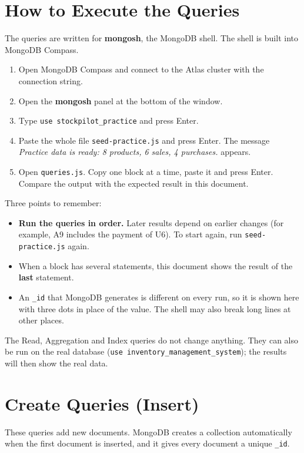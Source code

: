 \documentclass[11pt,a4paper]{article}
\newcommand{\code}[1]{\texttt{#1}}
\begin{document}
\section{How to Execute the Queries}
The queries are written for \textbf{mongosh}, the MongoDB shell. The shell is built into MongoDB Compass.
\begin{enumerate}
  \item Open MongoDB Compass and connect to the Atlas cluster with the connection string.
  \item Open the \textbf{mongosh} panel at the bottom of the window.
  \item Type \code{use stockpilot\_practice} and press Enter.
  \item Paste the whole file \code{seed-practice.js} and press Enter. The message \emph{Practice data is ready: 8 products, 6 sales, 4 purchases.} appears.
  \item Open \code{queries.js}. Copy one block at a time, paste it and press Enter. Compare the output with the expected result in this document.
\end{enumerate}

Three points to remember:
\begin{itemize}
  \item \textbf{Run the queries in order.} Later results depend on earlier changes (for example, A9 includes the payment of U6). To start again, run \code{seed-practice.js} again.
  \item When a block has several statements, this document shows the result of the \textbf{last} statement.
  \item An \code{\_id} that MongoDB generates is different on every run, so it is shown here with three dots in place of the value. The shell may also break long lines at other places.
\end{itemize}

The Read, Aggregation and Index queries do not change anything. They can also be run on the real database (\code{use inventory\_management\_system}); the results will then show the real data.


\section{Create Queries (Insert)}
These queries add new documents. MongoDB creates a collection automatically when the first document is inserted, and it gives every document a unique \code{\_id}.

\end{document}
